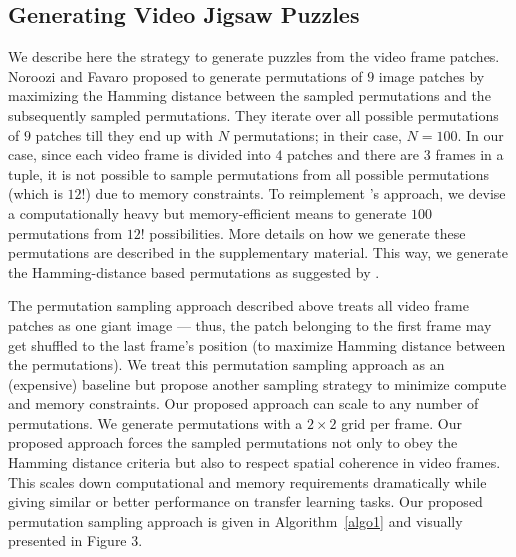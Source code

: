 \documentclass[10pt,twocolumn,letterpaper]{article}
\begin{document}
\subsection{Generating Video Jigsaw Puzzles}
We describe here the strategy to generate puzzles from the video frame patches. Noroozi and Favaro \cite{noroozi2016unsupervised} proposed to generate permutations of $9$ image patches by maximizing the Hamming distance between the sampled permutations and the subsequently sampled permutations. They iterate over all possible permutations of $9$ patches till they end up with $N$ permutations; in their case, $N = 100$. In our case, since each video frame is divided into $4$ patches and there are $3$ frames in a tuple, it is not possible to sample permutations from all possible permutations (which is $12!$) due to memory constraints. To reimplement \cite{noroozi2016unsupervised}'s approach, we devise a computationally heavy but memory-efficient means to generate $100$ permutations from $12!$ possibilities. More details on how we generate these permutations are described in the supplementary material. This way, we generate the Hamming-distance based permutations as suggested by \cite{noroozi2016unsupervised}. 

The permutation sampling approach described above treats all video frame patches as one giant image --- thus, the patch belonging to the first frame may get shuffled to the last frame's position (to maximize Hamming distance between the permutations). We treat this permutation sampling approach as an (expensive) baseline but propose another sampling strategy to minimize compute and memory constraints. Our proposed approach can scale to any number of permutations. We generate permutations with a $2\times2$ grid per frame. Our proposed approach forces the sampled permutations not only to obey the Hamming distance criteria but also to respect spatial coherence in video frames. This scales down computational and memory requirements dramatically while giving similar or better performance on transfer learning tasks. Our proposed permutation sampling approach is given in Algorithm~\ref{algo1} and visually presented in Figure 3. 
\vspace{-3mm}
\end{document}
